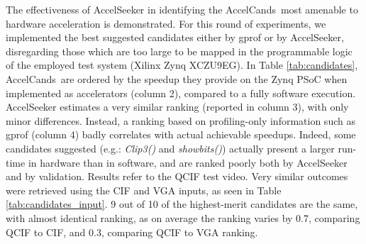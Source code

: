 \documentclass[]{usiinfthesis}
\newcommand{\aseeker}{{AccelSeeker}}
\newcommand{\candidates}{{AccelCand}s}
\begin{document}
The effectiveness of \aseeker{} in identifying
the \candidates\ most amenable to hardware acceleration is demonstrated. 
For this round of experiments, we implemented the best suggested candidates
either by gprof or by \aseeker{}, disregarding those which are too
large to be mapped in the programmable logic of the employed test
system (Xilinx Zynq XCZU9EG).  In Table \ref{tab:candidates},
\candidates\ are ordered by the speedup they provide on the Zynq PSoC 
when implemented as accelerators  (column 2), compared to a
fully software execution.  \aseeker{} estimates a very similar ranking
(reported in column 3), with only minor differences. Instead, a
ranking based on profiling-only information such as gprof (column 4)
badly correlates with actual achievable speedups.
Indeed, some candidates suggested (e.g.: \emph{Clip3()} and
\emph{showbits()}) actually present a larger run-time in hardware than
in software, and are ranked poorly both by \aseeker{} and by
validation.
Results refer to the QCIF test video. Very similar outcomes were retrieved 
using the CIF and VGA inputs, as seen in Table \ref{tab:candidates_input}. 
9 out of 10 of the highest-merit candidates are the same, with almost identical ranking,
as on average the ranking varies by 0.7, comparing QCIF to CIF, and 0.3, comparing QCIF 
to VGA ranking.
\end{document}

